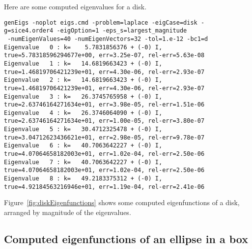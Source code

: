 Here are some computed eigenvalues for a disk.
\begin{Verbatim}[fontsize=\footnotesize]
genEigs -noplot eigs.cmd -problem=laplace -eigCase=disk -g=sice4.order4 -eigOption=1 -eps_s=largest_magnitude
 -numEigenValues=40 -numEigenVectors=32 -tol=1.e-12 -bc1=d
Eigenvalue   0 : k=    5.7831856376 + (-0) I,  true=5.78318596294677e+00, err=3.25e-07, rel-err=5.63e-08
Eigenvalue   1 : k=   14.6819663423 + (-0) I,  true=1.46819706421239e+01, err=4.30e-06, rel-err=2.93e-07
Eigenvalue   2 : k=   14.6819663423 + (-0) I,  true=1.46819706421239e+01, err=4.30e-06, rel-err=2.93e-07
Eigenvalue   3 : k=   26.3745765958 + (-0) I,  true=2.63746164271634e+01, err=3.98e-05, rel-err=1.51e-06
Eigenvalue   4 : k=   26.3746064090 + (-0) I,  true=2.63746164271634e+01, err=1.00e-05, rel-err=3.80e-07
Eigenvalue   5 : k=   30.4712325478 + (-0) I,  true=3.04712623436621e+01, err=2.98e-05, rel-err=9.78e-07
Eigenvalue   6 : k=   40.7063642227 + (-0) I,  true=4.07064658182003e+01, err=1.02e-04, rel-err=2.50e-06
Eigenvalue   7 : k=   40.7063642227 + (-0) I,  true=4.07064658182003e+01, err=1.02e-04, rel-err=2.50e-06
Eigenvalue   8 : k=   49.2183375312 + (-0) I,  true=4.92184563216946e+01, err=1.19e-04, rel-err=2.41e-06
\end{Verbatim}

Figure~\ref{fig:diskEigenfunctions} shows some computed eigenfunctions of a disk, arranged by magnitude of the
  eigenvalues.






\clearpage
\subsection{Computed eigenfunctions of an ellipse in a box}

